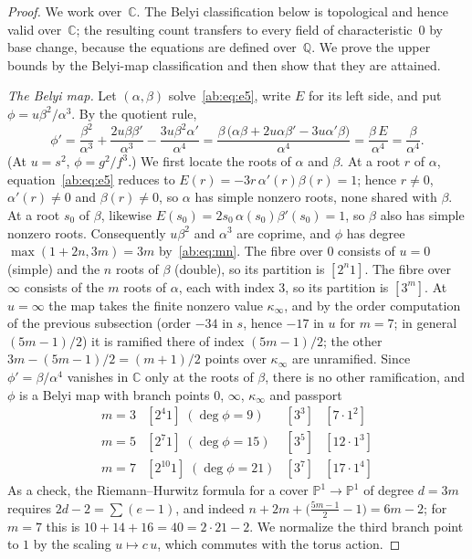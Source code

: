 \documentclass[a4paper,11pt]{article}
\theoremstyle{jsplain}
\theoremstyle{jsdef}
\theoremstyle{jsrem}
\begin{document}
\begin{proof}
We work over~$\mathbb{C}$. The Belyi classification below is topological and hence valid over~$\mathbb{C}$; the resulting count transfers to every field of characteristic~$0$ by base change, because the equations are defined over~$\mathbb{Q}$. We prove the upper bounds by the Belyi-map classification and then show that they are attained.

\emph{The Belyi map.} Let $(\alpha,\beta)$ solve~\eqref{ab:eq:e5}, write $E$ for its left side, and put $\phi=u\beta^2/\alpha^3$. By the quotient rule,
\[
\phi'=\frac{\beta^2}{\alpha^3}+\frac{2u\beta\beta'}{\alpha^3}-\frac{3u\beta^2\alpha'}{\alpha^4}
=\frac{\beta\,\bigl(\alpha\beta+2u\alpha\beta'-3u\alpha'\beta\bigr)}{\alpha^4}=\frac{\beta\,E}{\alpha^4}=\frac{\beta}{\alpha^4}.
\]
(At $u=s^2$, $\phi=g^2/f^3$.) We first locate the roots of $\alpha$ and $\beta$. At a root $r$ of $\alpha$, equation~\eqref{ab:eq:e5} reduces to $E(r)=-3r\,\alpha'(r)\beta(r)=1$; hence $r\neq0$, $\alpha'(r)\ne0$ and $\beta(r)\ne0$, so $\alpha$ has simple nonzero roots, none shared with $\beta$. At a root $s_0$ of $\beta$, likewise $E(s_0)=2s_0\,\alpha(s_0)\beta'(s_0)=1$, so $\beta$ also has simple nonzero roots. Consequently $u\beta^2$ and $\alpha^3$ are coprime, and $\phi$ has degree $\max(1+2n,3m)=3m$ by~\eqref{ab:eq:mn}. The fibre over $0$ consists of $u=0$ (simple) and the $n$ roots of $\beta$ (double), so its partition is $[2^n1]$. The fibre over $\infty$ consists of the $m$ roots of $\alpha$, each with index $3$, so its partition is $[3^m]$. At $u=\infty$ the map takes the finite nonzero value $\kappa_\infty$, and by the order computation of the previous subsection (order $-34$ in $s$, hence $-17$ in $u$ for $m=7$; in general $(5m-1)/2$) it is ramified there of index $(5m-1)/2$; the other $3m-(5m-1)/2=(m+1)/2$ points over $\kappa_\infty$ are unramified. Since $\phi'=\beta/\alpha^4$ vanishes in $\mathbb{C}$ only at the roots of $\beta$, there is no other ramification, and $\phi$ is a Belyi map with branch points $0$, $\infty$, $\kappa_\infty$ and passport
\[
\begin{array}{c|ccc}
m=3 & [2^4 1]\;(\deg\phi=9) & [3^3] & [7\cdot 1^2]\\
m=5 & [2^7 1]\;(\deg\phi=15) & [3^5] & [12\cdot 1^3]\\
m=7 & [2^{10}1]\;(\deg\phi=21) & [3^7] & [17\cdot 1^4]
\end{array}
\]
As a check, the Riemann--Hurwitz formula for a cover $\mathbb{P}^1\to\mathbb{P}^1$ of degree $d=3m$ requires $2d-2=\sum(e-1)$, and indeed $n+2m+\bigl(\tfrac{5m-1}2-1\bigr)=6m-2$; for $m=7$ this is $10+14+16=40=2\cdot21-2$. We normalize the third branch point to $1$ by the scaling $u\mapsto c\,u$, which commutes with the torus action.


\end{proof}
\end{document}
